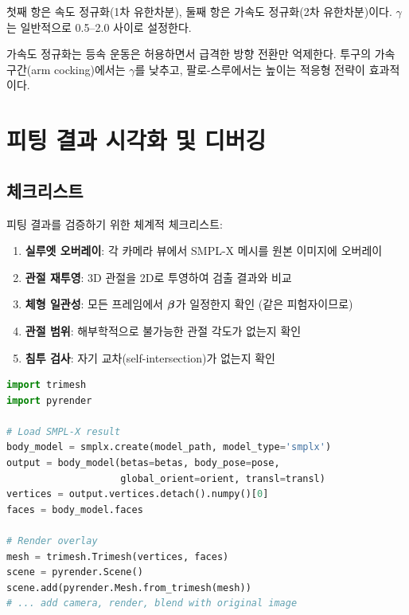 \documentclass[11pt, a4paper]{report}
\begin{document}
첫째 항은 속도 정규화(1차 유한차분), 둘째 항은 가속도 정규화(2차 유한차분)이다.
$\gamma$는 일반적으로 0.5--2.0 사이로 설정한다.

\begin{keyidea}
가속도 정규화는 등속 운동은 허용하면서 급격한 방향 전환만 억제한다.
투구의 가속 구간(arm cocking)에서는 $\gamma$를 낮추고,
팔로-스루에서는 높이는 적응형 전략이 효과적이다.
\end{keyidea}

\section{피팅 결과 시각화 및 디버깅}

\subsection{체크리스트}

피팅 결과를 검증하기 위한 체계적 체크리스트:

\begin{enumerate}[nosep]
  \item \textbf{실루엣 오버레이}: 각 카메라 뷰에서 SMPL-X 메시를 원본 이미지에 오버레이
  \item \textbf{관절 재투영}: 3D 관절을 2D로 투영하여 검출 결과와 비교
  \item \textbf{체형 일관성}: 모든 프레임에서 $\bm{\beta}$가 일정한지 확인 (같은 피험자이므로)
  \item \textbf{관절 범위}: 해부학적으로 불가능한 관절 각도가 없는지 확인
  \item \textbf{침투 검사}: 자기 교차(self-intersection)가 없는지 확인
\end{enumerate}

\begin{codebox}[title={피팅 결과 시각화}]
\begin{lstlisting}[language=Python]
import trimesh
import pyrender

# Load SMPL-X result
body_model = smplx.create(model_path, model_type='smplx')
output = body_model(betas=betas, body_pose=pose,
                    global_orient=orient, transl=transl)
vertices = output.vertices.detach().numpy()[0]
faces = body_model.faces

# Render overlay
mesh = trimesh.Trimesh(vertices, faces)
scene = pyrender.Scene()
scene.add(pyrender.Mesh.from_trimesh(mesh))
# ... add camera, render, blend with original image
\end{lstlisting}
\end{codebox}
\end{document}
